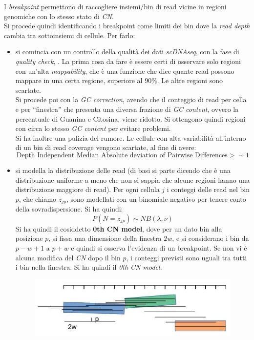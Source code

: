 \documentclass[a4paper,12pt, oneside]{book}
\begin{document}
I \textit{breakpoint} permettono di raccogliere insiemi/bin di read vicine in
regioni genomiche con lo stesso stato di \textit{CN}.\\
Si procede quindi identificando i breakpoint come limiti dei bin dove la \textit{read
  depth} cambia tra sottoinsiemi di cellule. Per farlo:
\begin{itemize}
  \item si comincia con un controllo della qualità dei dati \textit{scDNAseq},
  con la fase di \textit{quality check}, 
  . La prima cosa da fare è essere certi di osservare solo
  regioni con un'alta \textit{mappability}, che è una funzione che dice quante
  read possono mappare in una certa regione, superiore al $90\%$. Le altre
  regioni sono scartate.\\
  Si procede poi con la \textit{GC correction}, avendo che il conteggio di
  read per cella e per ``finestra'' che presenta una diversa frazione di
  \textit{GC content}, ovvero la percentuale di Guanina e Citosina, viene
  ridotto. Si ottengono quindi regioni con circa lo stesso \textit{GC
    content} per evitare problemi. \\
  Si ha inoltre una pulizia del rumore. Le cellule con alta variabilità
  all'interno di un bin di read coverage vengono scartate, al fine di avere:
  {\footnotesize{\[\mbox{Depth Independent Median Absolute deviation of Pairwise
          Differences} >\sim 1\]}}
  \item si modella la distribuzione delle read (di basi si parte dicendo che è
  una distribuzione uniforme a meno che non si sappia che alcune regioni hanno
  una distribuzione maggiore di read). Per ogni cellula $j$ i conteggi delle
  read nel bin $p$, che chiamo $z_{jp}$, sono modellati con un binomiale
  negativo per tenere conto della sovradispersione. Si ha quindi:
  \[P(N=z_{jp})\sim NB(\lambda,\nu)\]
  Si ha quindi il cosiddetto \textbf{0th CN model}, dove per un dato bin alla
  posizione $p$, si fissa una dimensione della finestra $2w$, e si considerano
  i bin da $p−w+1$ a $p+w$ e quindi si osserva l'evidenza di un breakpoint. Se
  non vi è alcuna modifica del \textit{CN} dopo il bin $p$, i conteggi
  previsti sono uguali tra tutti i bin nella finestra. Si ha quindi il
  \textit{0th CN model}: 
  \begin{figure}[H]
    \centering
    \includegraphics[scale = 0.45]{img/cna2.jpg}

\end{figure}
\end{itemize}
\end{document}
